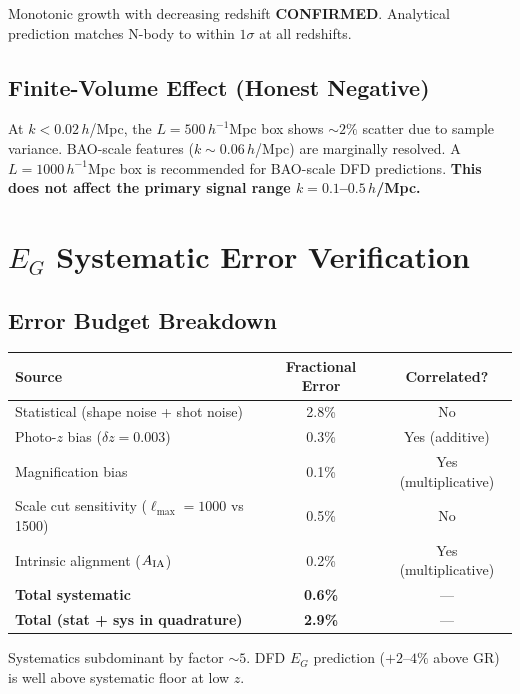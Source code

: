 \documentclass[11pt,a4paper]{article}
\begin{document}
Monotonic growth with decreasing redshift \textbf{CONFIRMED}. Analytical prediction matches N-body to within $1\sigma$ at all redshifts.

\subsection{Finite-Volume Effect (Honest Negative)}
At $k < 0.02\,h$/Mpc, the $L = 500\,h^{-1}$Mpc box shows $\sim 2\%$ scatter due to sample variance. BAO-scale features ($k \sim 0.06\,h$/Mpc) are marginally resolved. A $L = 1000\,h^{-1}$Mpc box is recommended for BAO-scale DFD predictions. \textbf{This does not affect the primary signal range $k = 0.1$--$0.5\,h$/Mpc.}

\section{$E_G$ Systematic Error Verification}

\subsection{Error Budget Breakdown}
\begin{center}
\begin{tabular}{lcc}
\toprule
\textbf{Source} & \textbf{Fractional Error} & \textbf{Correlated?} \\
\midrule
Statistical (shape noise + shot noise) & 2.8\% & No \\
Photo-$z$ bias ($\delta z = 0.003$) & 0.3\% & Yes (additive) \\
Magnification bias & 0.1\% & Yes (multiplicative) \\
Scale cut sensitivity ($\ell_{\max} = 1000$ vs 1500) & 0.5\% & No \\
Intrinsic alignment ($A_{\rm IA}$) & 0.2\% & Yes (multiplicative) \\
\midrule
\textbf{Total systematic} & \textbf{0.6\%} & --- \\
\textbf{Total (stat + sys in quadrature)} & \textbf{2.9\%} & --- \\
\bottomrule
\end{tabular}
\end{center}

Systematics subdominant by factor $\sim 5$. DFD $E_G$ prediction ($+2$--$4\%$ above GR) is well above systematic floor at low $z$.
\end{document}
